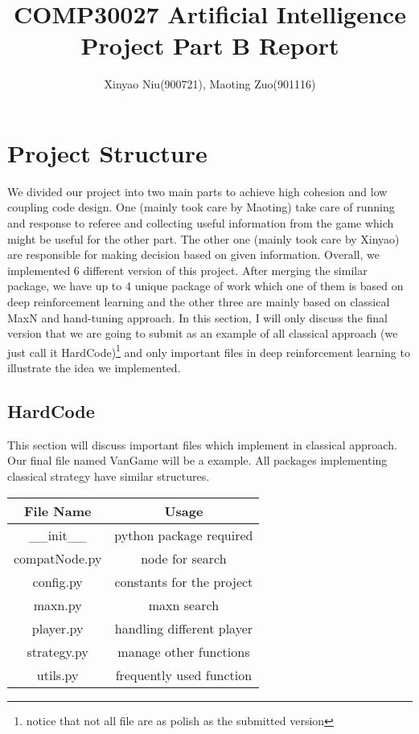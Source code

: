\documentclass[11pt]{article}
\title{COMP30027 Artificial Intelligence Project Part B Report}
\author{Xinyao Niu(900721), Maoting Zuo(901116)}
\begin{document}
\maketitle


\section{Project Structure}

We divided our project into two main parts to achieve high cohesion and low coupling code design.
One (mainly took care by Maoting) take care of running and response to referee and collecting 
useful information from the game which might be useful for the other part.
The other one (mainly took care by Xinyao) are responsible for making decision based on given information.
Overall, we implemented 6 different version of this project. After merging the similar package, we have 
up to 4 unique package of work which one of them is based on deep reinforcement learning and the other three are
mainly based on classical MaxN and hand-tuning approach. 
In this section, I will only discuss the final version that we are going to submit as an example of all classical
approach (we just call it HardCode)\footnote{notice that not all file are as polish as the submitted version}
and only important files in deep reinforcement learning to illustrate the idea we implemented.

\subsection{HardCode}

This section will discuss important files which implement in classical approach. 
Our final file named VanGame will be a example.
All packages implementing classical strategy have similar structures.

\begin{table}[H]
  \begin{tabular}{cc}

  \textbf{File Name}                  & \textbf{Usage}                        \\ \hline
  \multicolumn{1}{|c|}{\_\_init\_\_}  & \multicolumn{1}{c|}{python package required} \\ \hline
  \multicolumn{1}{|c|}{compatNode.py} & \multicolumn{1}{c|}{node for search}         \\ \hline
  \multicolumn{1}{|c|}{config.py}     & \multicolumn{1}{c|}{constants for the project}         \\ \hline
  \multicolumn{1}{|c|}{maxn.py}       & \multicolumn{1}{c|}{maxn search}         \\ \hline
  \multicolumn{1}{|c|}{player.py}        & \multicolumn{1}{c|}{handling different player}         \\ \hline
  \multicolumn{1}{|c|}{strategy.py}      & \multicolumn{1}{c|}{manage other functions}         \\ \hline
  \multicolumn{1}{|c|}{utils.py}         & \multicolumn{1}{c|}{frequently used function}         \\ \hline
  \end{tabular}
  \end{table}
\end{document}
